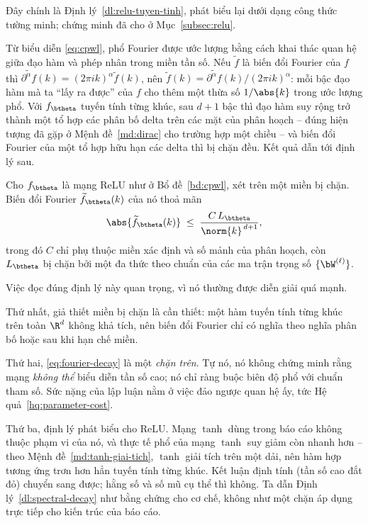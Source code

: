Đây chính là Định lý~\ref{dl:relu-tuyen-tinh}, phát biểu lại dưới dạng công thức
tường minh; chứng minh đã cho ở Mục~\ref{subsec:relu}.
 
Từ biểu diễn \eqref{eq:cpwl}, phổ Fourier được ước lượng bằng cách khai thác
quan hệ giữa đạo hàm và phép nhân trong miền tần số. Nếu $\widetilde{f}$ là biến
đổi Fourier của $f$ thì $\widetilde{\partial^{\alpha} f}(k)
= (2\pi i k)^{\alpha}\widetilde{f}(k)$, nên
$\widetilde{f}(k) = \widetilde{\partial^{\alpha}f}(k)/(2\pi i k)^{\alpha}$: mỗi
bậc đạo hàm mà ta ``lấy ra được'' của $f$ cho thêm một thừa số $1/\abs{k}$ trong
ước lượng phổ. Với $f_{\btheta}$ tuyến tính từng khúc, sau $d+1$ bậc thì đạo hàm
suy rộng trở thành một tổ hợp các phân bố delta trên các mặt của phân hoạch --
đúng hiện tượng đã gặp ở Mệnh đề~\ref{md:dirac} cho trường hợp một chiều -- và
biến đổi Fourier của một tổ hợp hữu hạn các delta thì bị chặn đều. Kết quả dẫn
tới định lý sau.
 
\begin{dinhly}
\label{dl:spectral-decay}
Cho $f_{\btheta}$ là mạng ReLU như ở Bổ đề~\ref{bd:cpwl}, xét trên một miền bị
chặn. Biến đổi Fourier $\widetilde{f}_{\btheta}(k)$ của nó thoả mãn
\begin{equation}
\abs{\widetilde{f}_{\btheta}(k)}
\;\le\;
\frac{C\, L_{\btheta}}{\norm{k}^{\,d+1}},
\label{eq:fourier-decay}
\end{equation}
trong đó $C$ chỉ phụ thuộc miền xác định và số mảnh của phân hoạch, còn
$L_{\btheta}$ bị chặn bởi một đa thức theo chuẩn của các ma trận trọng số
$\{\bW^{(\ell)}\}$.
\end{dinhly}
 
\begin{nhanxet}
\label{nx:doc-dinh-ly-pho}
Việc đọc đúng định lý này quan trọng, vì nó thường được diễn giải quá mạnh.
 
Thứ nhất, giả thiết miền bị chặn là cần thiết: một hàm tuyến tính từng khúc trên
toàn $\R^d$ không khả tích, nên biến đổi Fourier chỉ có nghĩa theo nghĩa phân bố
hoặc sau khi hạn chế miền.
 
Thứ hai, \eqref{eq:fourier-decay} là một \emph{chặn trên}. Tự nó, nó không chứng
minh rằng mạng \emph{không thể} biểu diễn tần số cao; nó chỉ ràng buộc biên độ
phổ với chuẩn tham số. Sức nặng của lập luận nằm ở việc đảo ngược quan hệ ấy, tức
Hệ quả~\ref{hq:parameter-cost}.
 
Thứ ba, định lý phát biểu cho ReLU. Mạng $\tanh$ dùng trong báo cáo không thuộc
phạm vi của nó, và thực tế phổ của mạng $\tanh$ suy giảm còn nhanh hơn -- theo
Mệnh đề~\ref{md:tanh-giai-tich}, $\tanh$ giải tích trên một dải, nên hàm hợp
tương ứng trơn hơn hẳn tuyến tính từng khúc. Kết luận định tính (tần số cao đắt
đỏ) chuyển sang được; hằng số và số mũ cụ thể thì không. Ta dẫn
Định lý~\ref{dl:spectral-decay} như bằng chứng cho cơ chế, không như một chặn áp
dụng trực tiếp cho kiến trúc của báo cáo.
\end{nhanxet}
 
